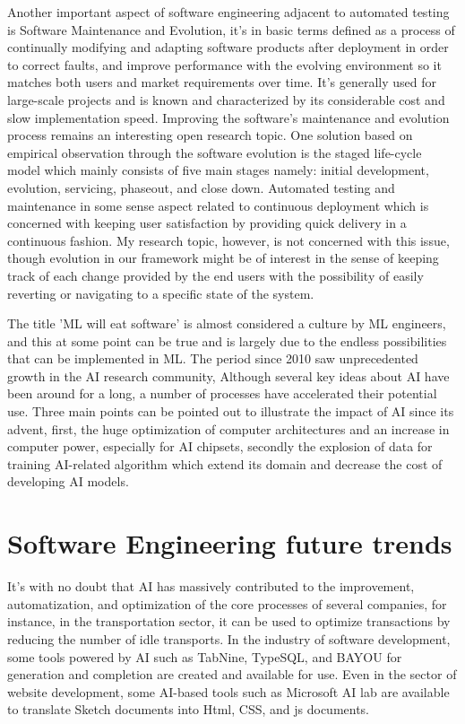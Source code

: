 \documentclass{article}
\begin{document}
Another important aspect of software engineering adjacent to automated testing is Software Maintenance and Evolution, it's in basic terms defined as a process of continually modifying and adapting software products after deployment in order to correct faults, and improve performance with the evolving environment so it matches both users and market requirements over time. It's generally used for large-scale projects and is known and characterized by its considerable cost and slow implementation speed. Improving the software's maintenance and evolution process remains an interesting open research topic. One solution based on empirical observation through the software evolution is the staged life-cycle model which mainly consists of five main stages namely: initial development, evolution, servicing, phaseout, and close down. Automated testing and maintenance in some sense aspect related to continuous deployment which is concerned with keeping user satisfaction by providing quick delivery in a continuous fashion. My research topic, however, is not concerned with this issue, though evolution in our framework might be of interest in the sense of keeping track of each change provided by the end users with the possibility of easily reverting or navigating to a specific state of the system.\newline

The title 'ML will eat software' is almost considered a culture by ML engineers, and this at some point can be true and is largely due to the endless possibilities that can be implemented in ML. The period since 2010 saw unprecedented growth in the AI research community, Although several key ideas about AI have been around for a long, a number of processes have accelerated their potential use. Three main points can be pointed out to illustrate the impact of AI since its advent, first, the huge optimization of computer architectures and an increase in computer power, especially for AI chipsets, secondly the explosion of data for training AI-related algorithm which extend its domain and decrease the cost of developing AI models. 

\section{Software Engineering future trends}

It's with no doubt that AI has massively contributed to the improvement, automatization, and optimization of the core processes of several companies, for instance, in the transportation sector, it can be used to optimize transactions by reducing the number of idle transports. In the industry of software development, some tools powered by AI such as TabNine, TypeSQL, and BAYOU for generation and completion are created and available for use. Even in the sector of website development, some AI-based tools such as Microsoft AI lab are available to translate Sketch documents into Html, CSS, and js documents.\newline
\end{document}
